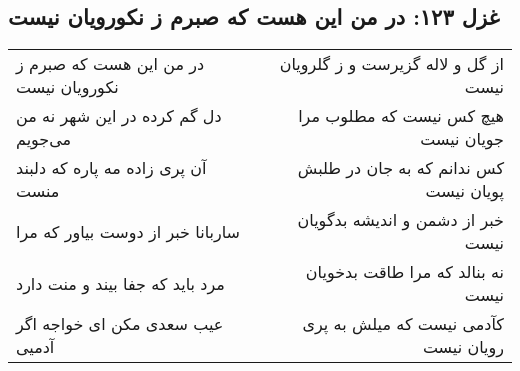 \begin{center}
\section*{غزل ۱۲۳: در من این هست که صبرم ز نکورویان نیست}
\label{sec:123}
\begin{longtable}{l p{0.5cm} r}
در من این هست که صبرم ز نکورویان نیست
&&
از گل و لاله گزیرست و ز گلرویان نیست
\\
دل گم کرده در این شهر نه من می‌جویم
&&
هیچ کس نیست که مطلوب مرا جویان نیست
\\
آن پری زاده مه پاره که دلبند منست
&&
کس ندانم که به جان در طلبش پویان نیست
\\
ساربانا خبر از دوست بیاور که مرا
&&
خبر از دشمن و اندیشه بدگویان نیست
\\
مرد باید که جفا بیند و منت دارد
&&
نه بنالد که مرا طاقت بدخویان نیست
\\
عیب سعدی مکن ای خواجه اگر آدمیی
&&
کآدمی نیست که میلش به پری رویان نیست
\\
\end{longtable}
\end{center}
